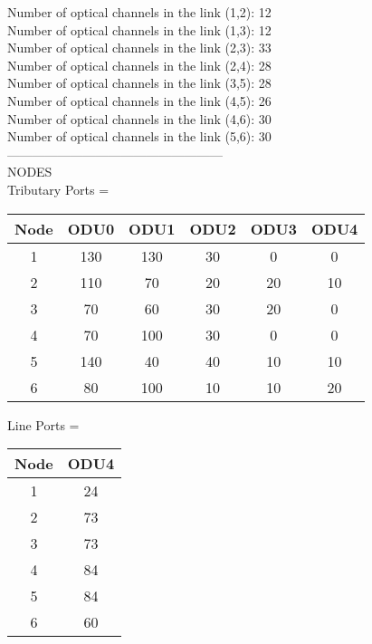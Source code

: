 Number of optical channels in the link (1,2): 12 \\
\qquad Number of optical channels in the link (1,3): 12 \\
\qquad Number of optical channels in the link (2,3): 33 \\
\qquad Number of optical channels in the link (2,4): 28 \\
\qquad Number of optical channels in the link (3,5): 28 \\
\qquad Number of optical channels in the link (4,5): 26 \\
\qquad Number of optical channels in the link (4,6): 30 \\
\qquad Number of optical channels in the link (5,6): 30 \\


---------------------------------------------------\\
NODES\\

Tributary Ports = \\

\begin{tabular}{|c|c|c|c|c|c|}
  \hline
  Node & ODU0 & ODU1 & ODU2 & ODU3 & ODU4 \\
  \hline\hline
  1 & 130 & 130 & 30 & 0 & 0 \\
  2 & 110 & 70 & 20 & 20 & 10 \\
  3 & 70 & 60 & 30 & 20 & 0 \\
  4 & 70 & 100 & 30 & 0 & 0 \\
  5 & 140 & 40 & 40 & 10 & 10 \\
  6 & 80 & 100 & 10 & 10 & 20 \\
  \hline
\end{tabular}

\vspace{11pt}

Line Ports = \\


\begin{tabular}{|c|c|}
  \hline
  Node & ODU4 \\
  \hline\hline
  1 & 24 \\
  2 & 73 \\
  3 & 73 \\
  4 & 84 \\
  5 & 84 \\
  6 & 60 \\
  \hline
\end{tabular}

\vspace{11pt}

